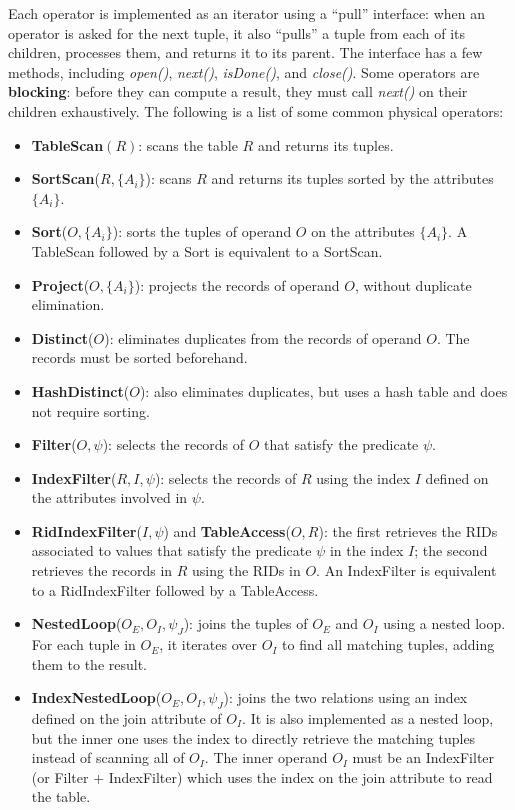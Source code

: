 Each operator is implemented as an iterator using a ``pull'' interface: when an operator is asked for the next tuple, it also ``pulls'' a tuple from each of its children, processes them, and returns it to its parent. The interface has a few methods, including \textit{open()}, \textit{next()}, \textit{isDone()}, and \textit{close()}. Some operators are \textbf{blocking}: before they can compute a result, they must call \textit{next()} on their children exhaustively. The following is a list of some common physical operators:
\begin{itemize}
    \item \textbf{TableScan}$(R)$: scans the table $R$ and returns its tuples.
    \item \textbf{SortScan}($R, \{A_i\}$): scans $R$ and returns its tuples sorted by the attributes $\{A_i\}$.
    \item \textbf{Sort}($O, \{A_i\}$): sorts the tuples of operand $O$ on the attributes $\{A_i\}$. A TableScan followed by a Sort is equivalent to a SortScan.
    \item \textbf{Project}($O, \{A_i\}$): projects the records of operand $O$, without duplicate elimination.
    \item \textbf{Distinct}($O$): eliminates duplicates from the records of operand $O$. The records must be sorted beforehand.
    \item \textbf{HashDistinct}($O$): also eliminates duplicates, but uses a hash table and does not require sorting.
    \item \textbf{Filter}($O, \psi$): selects the records of $O$ that satisfy the predicate $\psi$.
    \item \textbf{IndexFilter}($R, I, \psi$): selects the records of $R$ using the index $I$ defined on the attributes involved in $\psi$.
    \item \textbf{RidIndexFilter}($I, \psi$) and \textbf{TableAccess}($O,R$): the first retrieves the RIDs associated to values that satisfy the predicate $\psi$ in the index $I$; the second retrieves the records in $R$ using the RIDs in $O$. An IndexFilter is equivalent to a RidIndexFilter followed by a TableAccess.
    \item \textbf{NestedLoop}($O_E, O_I, \psi_J$): joins the tuples of $O_E$ and $O_I$ using a nested loop. For each tuple in $O_E$, it iterates over $O_I$ to find all matching tuples, adding them to the result.
    \item \textbf{IndexNestedLoop}($O_E, O_I, \psi_J$): joins the two relations using an index defined on the join attribute of $O_I$. It is also implemented as a nested loop, but the inner one uses the index to directly retrieve the matching tuples instead of scanning all of $O_I$. The inner operand $O_I$ must be an IndexFilter (or Filter + IndexFilter) which uses the index on the join attribute to read the table.

\end{itemize}
